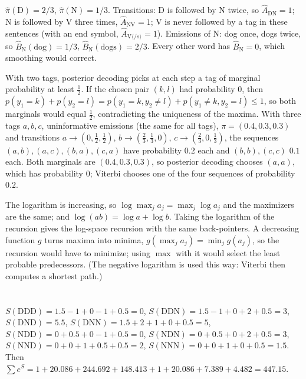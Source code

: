 $\hat\pi(\mathrm D) = 2/3$, $\hat\pi(\mathrm N) = 1/3$. Transitions: D is followed by N twice, so $\hat A_{\mathrm{DN}} = 1$; N is followed by V three times,
$\hat A_{\mathrm{NV}} = 1$; V is never followed by a tag in these sentences (with an end symbol, $\hat A_{\mathrm V\langle/s\rangle} = 1$).
Emissions of N: dog once, dogs twice, so $\hat B_{\mathrm N}(\text{dog}) = 1/3$, $\hat B_{\mathrm N}(\text{dogs}) = 2/3$. Every other word has
$\hat B_{\mathrm N} = 0$, which smoothing would correct.

With two tags, posterior decoding picks at each step a tag of marginal probability at least $\frac12$. If the
chosen pair $(k, l)$ had probability $0$, then $p(y_1 = k) + p(y_2 = l) = p(y_1 = k, y_2\neq l) + p(y_1\neq k, y_2 = l)\leq1$, so both marginals would equal $\frac12$, contradicting the uniqueness of the maxima. With three tags $a, b, c$, uninformative emissions (the same
for all tags), $\pi = (0.4, 0.3, 0.3)$ and transitions $a\to(0, \frac12, \frac12)$, $b\to(\frac23, \frac13, 0)$, $c\to(\frac23, 0, \frac13)$, the sequences
$(a, b), (a, c), (b, a), (c, a)$ have probability $0.2$ each and $(b, b), (c, c)$ $0.1$ each. Both marginals are $(0.4, 0.3, 0.3)$, so posterior
decoding chooses $(a, a)$, which has probability $0$; Viterbi chooses one of the four sequences of
probability $0.2$.

The logarithm is increasing, so $\log\max_ja_j = \max_j\log a_j$ and the maximizers are the same; and $\log(ab) = \log a + \log b$. Taking
the logarithm of the recursion gives the log-space recursion with the same back-pointers. A
decreasing function $g$ turns maxima into minima, $g(\max_ja_j) = \min_jg(a_j)$, so the recursion would have to
minimize; using $\max$ with it would select the least probable predecessors. (The negative
logarithm is used this way: Viterbi then computes a shortest path.)

\section{}

$S(\mathrm{DDD}) = 1.5 - 1 + 0 - 1 + 0.5 = 0$, $S(\mathrm{DDN}) = 1.5 - 1 + 0 + 2 + 0.5 = 3$, $S(\mathrm{DND}) = 5.5$, $S(\mathrm{DNN}) = 1.5 + 2 + 1 + 0 + 0.5 = 5$, $S(\mathrm{NDD}) = 0 + 0.5 + 0 - 1 + 0.5 = 0$,
$S(\mathrm{NDN}) = 0 + 0.5 + 0 + 2 + 0.5 = 3$, $S(\mathrm{NND}) = 0 + 0 + 1 + 0.5 + 0.5 = 2$, $S(\mathrm{NNN}) = 0 + 0 + 1 + 0 + 0.5 = 1.5$. Then
$\sum e^S = 1 + 20.086 + 244.692 + 148.413 + 1 + 20.086 + 7.389 + 4.482 = 447.15$.

